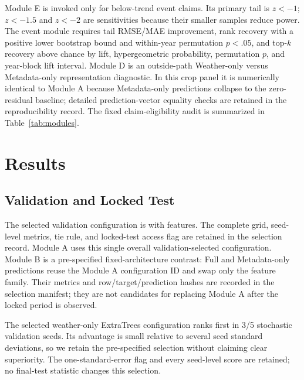 \documentclass[conference]{IEEEtran}
\renewcommand{\arraystretch}{0.98}
\begin{document}
Module E is invoked only for below-trend event claims. Its primary tail is $z<-1$;
$z<-1.5$ and $z<-2$ are sensitivities because their smaller samples reduce power.
The event module requires tail RMSE/MAE improvement, rank recovery with a positive
lower bootstrap bound and within-year permutation $p<.05$, and top-$k$ recovery
above chance by lift, hypergeometric probability, permutation $p$, and year-block
lift interval. Module D is an outside-path Weather-only versus Metadata-only
representation diagnostic. In this crop panel it is numerically identical to
Module A because Metadata-only predictions collapse to the zero-residual baseline;
detailed prediction-vector equality checks are retained in the reproducibility
record. The fixed claim-eligibility audit is summarized in
Table~\ref{tab:modules}.

\begin{table}[t]
\centering
\caption{Fixed claim-eligibility modules and locked crop-panel verdicts. Module D
(Weather-only versus Metadata-only) is a descriptive representation diagnostic
outside the permission path and is therefore not a required row. Full
configuration details are in the reproducibility manifest.}
\label{tab:modules}
\footnotesize
\renewcommand{\arraystretch}{1.12}
\resizebox{\textwidth}{!}{}
\end{table}

\section{Results}
\subsection{Validation and Locked Test}
The selected validation configuration is \AuditSelectedModel{} with
\AuditSelectedFamily{} features. The complete
grid, seed-level metrics, tie rule, and locked-test access flag are retained in the
selection record. Module A uses this single overall validation-selected
configuration. Module B is a pre-specified fixed-architecture contrast: Full and
Metadata-only predictions reuse the Module A configuration ID and swap only the
feature family. Their metrics and row/target/prediction hashes are recorded in
the selection manifest; they are not candidates for replacing Module A after the
locked period is observed.

The selected weather-only ExtraTrees configuration ranks first in 3/5 stochastic
validation seeds. Its advantage is small relative to several seed standard
deviations, so we retain the pre-specified selection without claiming clear
superiority. The one-standard-error flag and every seed-level
score are retained; no final-test statistic changes this selection.
\end{document}
